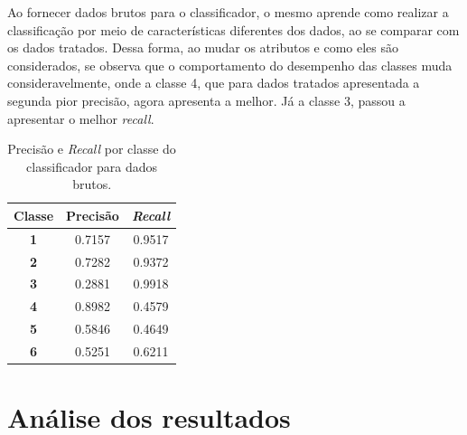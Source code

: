 Ao fornecer dados brutos para o classificador, o mesmo aprende como realizar a classificação por meio de características diferentes dos dados, ao se comparar com os dados tratados. Dessa forma, ao mudar os atributos e como eles são considerados, se observa que o comportamento do desempenho das classes muda consideravelmente, onde a classe 4, que para dados tratados apresentada a segunda pior precisão, agora apresenta a melhor. Já a classe 3, passou a apresentar o melhor \textit{recall}.

\begin{table}[H]
	\centering
	\begin{tabular}{c|c|c}
		\textbf{Classe} & \textbf{Precisão} & \textit{\textbf{Recall}} \\ \hline
		\textbf{1}      & 0.7157            & 0.9517                   \\
		\textbf{2}      & 0.7282            & 0.9372                   \\
		\textbf{3}      & 0.2881            & 0.9918                   \\
		\textbf{4}      & 0.8982            & 0.4579                   \\
		\textbf{5}      & 0.5846            & 0.4649                   \\
		\textbf{6}      & 0.5251            & 0.6211                  
	\end{tabular}
	\caption{Precisão e \textit{Recall} por classe do classificador para dados brutos.}
	\label{tab:pr_knn_2}
\end{table}

\clearpage
\section{Análise dos resultados}


	















